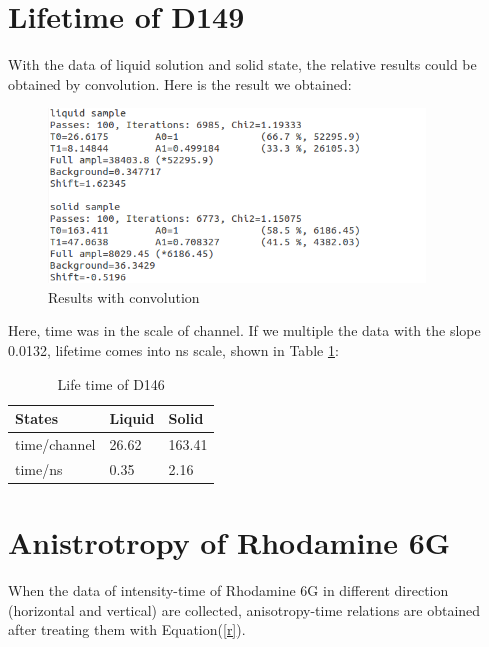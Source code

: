 \documentclass{article}
\begin{document}
\section{Lifetime of D149}
With the data of liquid solution and solid state, the relative results could be obtained by convolution. Here is the result we obtained:\par
\begin{figure}
\begin{center}
\includegraphics[width=10cm]{result1}
\caption{Results with convolution}
\label{convolution}
\end{center}
\end{figure}
\par
Here, time was in the scale of channel. If we multiple the data with the slope 0.0132, lifetime comes into ns scale, shown in Table \ref{my-label2}:
\par
\begin{table}
\centering
\caption{Life time of D146}
\label{my-label2}
\begin{tabular}{@{}lll@{}}
\toprule
States & Liquid & Solid\\ \midrule
time/channel  & 26.62 & 163.41 \\ 
time/ns &0.35 & 2.16 \\
\bottomrule
\end{tabular}
\end{table}




\section{Anistrotropy of Rhodamine 6G}
When the data of intensity-time of Rhodamine 6G in different direction (horizontal and vertical) are collected, anisotropy-time relations are obtained after treating them with Equation(\ref{r}).\par 
\end{document}
